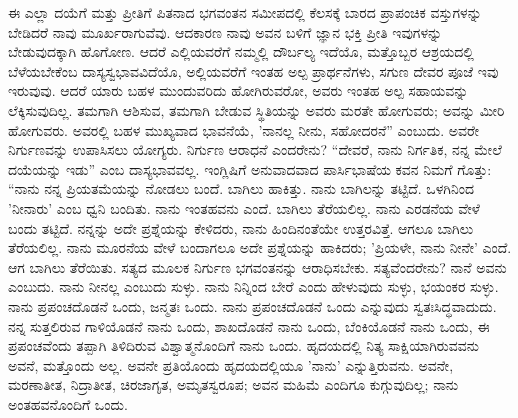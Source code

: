 ಈ ಎಲ್ಲಾ ದಯೆಗೆ ಮತ್ತು ಪ್ರೀತಿಗೆ ಪಿತನಾದ ಭಗವಂತನ ಸಮೀಪದಲ್ಲಿ ಕೆಲಸಕ್ಕೆ ಬಾರದ ಪ್ರಾಪಂಚಿಕ ವಸ್ತುಗಳನ್ನು ಬೇಡಿದರೆ ನಾವು ಮೂರ್ಖರಾಗುವೆವು. ಆದಕಾರಣ ನಾವು ಅವನ ಬಳಿಗೆ ಜ್ಞಾನ ಭಕ್ತಿ ಪ್ರೀತಿ ಇವುಗಳನ್ನು ಬೇಡುವುದಕ್ಕಾಗಿ ಹೊಗೋಣ. ಆದರೆ ಎಲ್ಲಿಯವರೆಗೆ ನಮ್ಮಲ್ಲಿ ದೌರ್ಬಲ್ಯ ಇದೆಯೊ, ಮತ್ತೊಬ್ಬರ ಆಶ್ರಯದಲ್ಲಿ ಬೆಳೆಯಬೇಕೆಂಬ ದಾಸ್ಯಸ್ವಭಾವವಿದೆಯೊ, ಅಲ್ಲಿಯವರೆಗೆ ಇಂತಹ ಅಲ್ಪ ಪ್ರಾರ್ಥನೆಗಳು, ಸಗುಣ ದೇವರ ಪೂಜೆ ಇವು ಇರುವುವು. ಆದರೆ ಯಾರು ಬಹಳ ಮುಂದುವರಿದು ಹೋಗಿರುವರೋ, ಅವರು ಇಂತಹ ಅಲ್ಪ ಸಹಾಯವನ್ನು ಲೆಕ್ಕಿಸುವುದಿಲ್ಲ. ತಮಗಾಗಿ ಆಶಿಸುವ, ತಮಗಾಗಿ ಬೇಡುವ ಸ್ಥಿತಿಯನ್ನು ಅವರು ಮರತೇ ಹೋಗುವರು; ಅವನ್ನು ಮೀರಿ ಹೋಗುವರು. ಅವರಲ್ಲಿ ಬಹಳ ಮುಖ್ಯವಾದ ಭಾವನೆಯೆ, 'ನಾನಲ್ಲ ನೀನು, ಸಹೋದರನೆ'' ಎಂಬುದು. ಅವರೇ ನಿರ್ಗುಣವನ್ನು ಉಪಾಸಿಸಲು ಯೋಗ್ಯರು. ನಿರ್ಗುಣ ಆರಾಧನೆ ಎಂದರೇನು? “ದೇವರೆ, ನಾನು ನಿರ್ಗತಿಕ, ನನ್ನ ಮೇಲೆ ದಯೆಯನ್ನು ಇಡು'' ಎಂಬ ದಾಸ್ಯಭಾವವಲ್ಲ. ಇಂಗ್ಲಿಷಿಗೆ ಅನುವಾದವಾದ ಪಾರ್ಸಿಭಾಷೆಯ ಕವನ ನಿಮಗೆ ಗೊತ್ತು: “ನಾನು ನನ್ನ ಪ್ರಿಯತಮೆಯನ್ನು ನೋಡಲು ಬಂದೆ. ಬಾಗಿಲು ಹಾಕಿತ್ತು. ನಾನು ಬಾಗಿಲನ್ನು ತಟ್ಟಿದೆ. ಒಳಗಿನಿಂದ 'ನೀನಾರು' ಎಂಬ ಧ್ವನಿ ಬಂದಿತು. ನಾನು ಇಂತಹವನು ಎಂದೆ. ಬಾಗಿಲು ತೆರೆಯಲಿಲ್ಲ. ನಾನು ಎರಡನೆಯ ವೇಳೆ ಬಂದು ತಟ್ಟಿದೆ. ನನ್ನನ್ನು ಅದೇ ಪ್ರಶ್ನೆಯನ್ನು ಕೇಳಿದರು, ನಾನು ಹಿಂದಿನಂತೆಯೇ ಉತ್ತರವಿತ್ತೆ. ಆಗಲೂ ಬಾಗಿಲು ತೆರೆಯಲಿಲ್ಲ. ನಾನು ಮೂರನೆಯ ವೇಳೆ ಬಂದಾಗಲೂ ಅದೇ ಪ್ರಶ್ನೆಯನ್ನು ಹಾಕಿದರು; 'ಪ್ರಿಯಳೇ, ನಾನು ನೀನೇ' ಎಂದೆ. ಆಗ ಬಾಗಿಲು ತೆರೆಯಿತು. ಸತ್ಯದ ಮೂಲಕ ನಿರ್ಗುಣ ಭಗವಂತನನ್ನು ಆರಾಧಿಸಬೇಕು. ಸತ್ಯವೆಂದರೇನು? ನಾನೆ ಅವನು ಎಂಬುದು. ನಾನು ನೀನಲ್ಲ ಎಂಬುದು ಸುಳ್ಳು. ನಾನು ನಿನ್ನಿಂದ ಬೇರೆ ಎಂದು ಹೇಳುವುದು ಸುಳ್ಳು, ಭಯಂಕರ ಸುಳ್ಳು. ನಾನು ಪ್ರಪಂಚದೊಡನೆ ಒಂದು, ಜನ್ಮತಃ ಒಂದು. ನಾನು ಪ್ರಪಂಚದೊಡನೆ ಒಂದು ಎನ್ನುವುದು ಸ್ವತಃಸಿದ್ಧವಾದುದು. ನನ್ನ ಸುತ್ತಲಿರುವ ಗಾಳಿಯೊಡನೆ ನಾನು ಒಂದು, ಶಾಖದೊಡನೆ ನಾನು ಒಂದು, ಬೆಂಕಿಯೊಡನೆ ನಾನು ಒಂದು, ಈ ಪ್ರಪಂಚವೆಂದು ತಪ್ಪಾಗಿ ತಿಳಿದಿರುವ ವಿಶ್ವಾತ್ಮನೊಂದಿಗೆ ನಾನು ಒಂದು. ಹೃದಯದಲ್ಲಿ ನಿತ್ಯ ಸಾಕ್ಷಿಯಾಗಿರುವವನು ಅವನೆ, ಮತ್ತೊಂದು ಅಲ್ಲ. ಅವನೇ ಪ್ರತಿಯೊಂದು ಹೃದಯದಲ್ಲಿಯೂ 'ನಾನು' ಎನ್ನುತ್ತಿರುವನು. ಅವನೇ, ಮರಣಾತೀತ, ನಿದ್ರಾತೀತ, ಚಿರಜಾಗೃತ, ಅಮೃತಸ್ವರೂಪ; ಅವನ ಮಹಿಮೆ ಎಂದಿಗೂ ಕುಗ್ಗುವುದಿಲ್ಲ; ನಾನು ಅಂತಹವನೊಂದಿಗೆ ಒಂದು.

